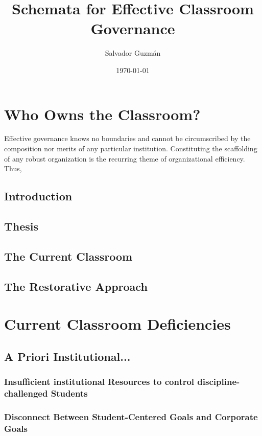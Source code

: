 \documentclass[12pt]{article}
\author{Salvador Guzm\'{a}n}
\date{\today}
\title{Schemata for Effective Classroom Governance}
\begin{document}
	\maketitle
	\pagebreak
	\tableofcontents
	\pagebreak

	\section{Who Owns the Classroom?}
	Effective governance knows no boundaries and cannot be circumscribed by the composition nor merits of any particular institution. Constituting the scaffolding of any robust organization is the recurring theme of organizational efficiency.  Thus, 
	\subsection{Introduction}
	\subsection{Thesis}
	\subsection{The Current Classroom}
	\subsection{The Restorative Approach}
	
	\section{Current Classroom Deficiencies}
	
	\subsection{A Priori Institutional...}
	\subsubsection{Insufficient institutional Resources to control discipline-challenged Students}
	\subsubsection{Disconnect Between Student-Centered Goals and Corporate Goals}
\end{document}
